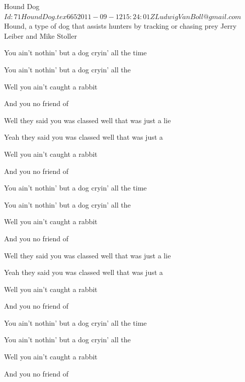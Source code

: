 \begin{SBSong}{Hound Dog}
  {$Id: 71HoundDog.tex 665 2011-09-12 15:24:01Z LudwigVanBoll@gmail.com $}
  {Hound, a type of dog that assists hunters by tracking or chasing prey}
  {Jerry Leiber and Mike Stoller}
  \begin{SBVerse}
    You ain't nothin' but a  dog cryin' all the time 
    
    You ain't nothin' but a  dog cryin' all the 
    
    Well you ain't  caught a rabbit 
    
    And you  no friend of   
  \end{SBVerse}
  \begin{SBVerse}
    Well they said you was  classed well that was just a lie 
    
    Yeah they said you was  classed well that was just a  
    
    Well you ain't  caught a rabbit 
    
    And you  no friend of   
  \end{SBVerse}
  \begin{SBVerse}
    You ain't nothin' but a  dog cryin' all the time 
    
    You ain't nothin' but a  dog cryin' all the 
    
    Well you ain't  caught a rabbit 
    
    And you  no friend of   
  \end{SBVerse}
  \begin{SBVerse}
    Well they said you was  classed well that was just a lie 
    
    Yeah they said you was  classed well that was just a  
    
    Well you ain't  caught a rabbit 
    
    And you  no friend of   
  \end{SBVerse}
  \begin{SBVerse}
    You ain't nothin' but a  dog cryin' all the time 
    
    You ain't nothin' but a  dog cryin' all the 
    
    Well you ain't  caught a rabbit 
    
    And you  no friend of   
  \end{SBVerse}
\end{SBSong}                                                                                                    